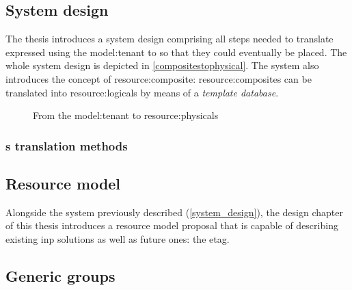 \subsection{System design} \label{system_design}
The thesis introduces a system design comprising all steps needed to translate  expressed using the \gls{model:tenant} to  so that they could eventually be placed.
The whole system design is depicted in \autoref{compositestophysical}.
The system also introduces the concept of \gls{resource:composite}:
\Glspl{resource:composite} can be translated into \glspl{resource:logical} by means of a \textit{template database}.

\newsavebox\compositestophysical \savebox{}
\begin{figure}[!htb]
    \centering
    \usebox{\compositestophysical}
    \caption{From the \gls{model:tenant} to \glspl{resource:physical}}
    \label{compositestophysical}
\end{figure}

\subsubsection{\texorpdfstring{}{Composite}s translation methods}


\subsection{Resource model}
Alongside the system previously described (\autoref{system_design}), the design chapter of this thesis introduces a resource model proposal that is capable of describing existing \gls{inp} solutions as well as future ones: the \gls{etag}.
\newsavebox\tagmodfigure \savebox{}


\subsection{Generic groups}


